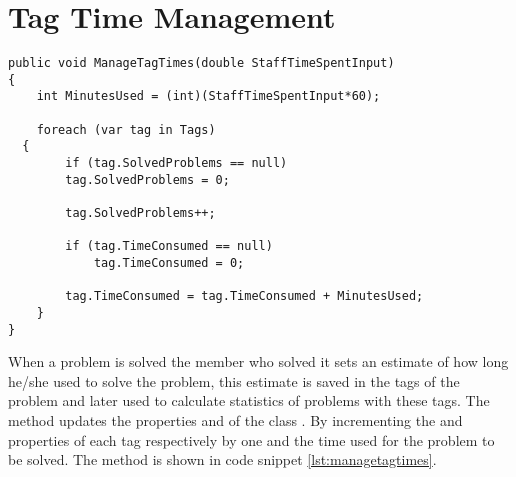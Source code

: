 \section{Tag Time Management}
\label{sec:managetagtimes}




\begin{lstlisting}[style=sourceCode, caption=\myCaption{The \me{ManageTagTimes} method}, label=lst:managetagtimes,float=hp]
public void ManageTagTimes(double StaffTimeSpentInput)
{
	int MinutesUsed = (int)(StaffTimeSpentInput*60);
	
	foreach (var tag in Tags)
  {
		if (tag.SolvedProblems == null)
		tag.SolvedProblems = 0;
    
		tag.SolvedProblems++;

		if (tag.TimeConsumed == null)
			tag.TimeConsumed = 0;

		tag.TimeConsumed = tag.TimeConsumed + MinutesUsed;
	}
}
\end{lstlisting}


When a problem is solved the \astaff[] member who solved it sets an estimate of how long he/she used to solve the problem, this estimate is saved in the tags of the problem and later used to calculate statistics of problems with these tags. 
The  method updates the properties  and  of the class .
By incrementing the  and  properties of each tag respectively by one and the time used for the problem to be solved.
The method is shown in code snippet \ref{lst:managetagtimes}.



